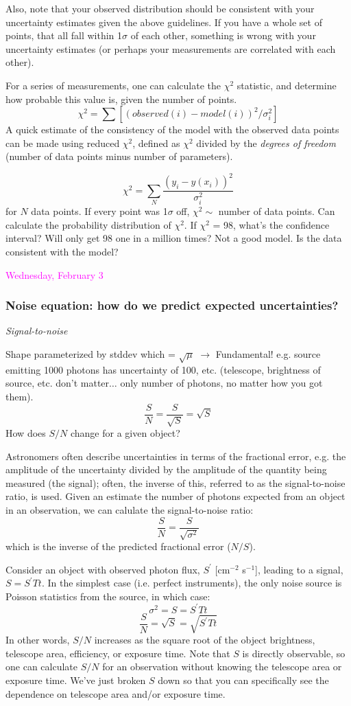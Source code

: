 \documentclass[12pt]{article}
\begin{document}
Also, note that your observed distribution should be
consistent with your uncertainty estimates given the above guidelines.
If you have a whole set of points, that all fall within 1$\sigma$ of
each other, something is wrong with your uncertainty estimates (or
perhaps your measurements are correlated with each other).

For a series of measurements, one can calculate the
$\chi^{2}$ statistic, and determine how probable this value is,
given the number of points.
    $$ \chi^2 = \sum [(observed(i)-model(i))^2/\sigma_i^2]  $$
A quick estimate of the consistency of the model with the observed
data points can be made using reduced $\chi^{2}$, defined as
$\chi^{2}$ divided by the \emph{degrees of freedom} (number of data points
minus number of parameters).

\textcolor{myBlue}{
    $$  \chi^2 = \sum_N \frac{(y_i-y(x_i))^2}{\sigma_i^2} $$
for $N$ data points. If every point was 1$\sigma$ off,
$\chi^2 \sim$ number of data points. Can calculate the probability
distribution of $\chi^2$. If $\chi^2$ = 98, what's the confidence
interval? Will only get 98 one in a million times? Not a good model.
Is the data consistent with the model?
}

\textcolor{magenta}{Wednesday, February 3}
\subsubsection*{Noise equation: how do we predict expected
uncertainties?}
\emph{Signal-to-noise}

\textcolor{myBlue}{
Shape parameterized by stddev which = $\sqrt{\mu}$
$\rightarrow$ Fundamental! e.g. source emitting 1000 photons has
uncertainty of 100, etc. (telescope, brightness of source, etc. don't
matter$\ldots$ only number of photons, no matter how you got them).
    $$ \frac{S}{N} = \frac{S}{\sqrt{S}} = \sqrt{S} $$
How does $S/N$ change for a given object?
}

Astronomers often describe uncertainties in terms of the fractional
error, e.g. the amplitude of the uncertainty divided by the amplitude
of the quantity being measured (the signal);
often, the inverse of this, referred
to as the signal-to-noise ratio, is used. Given an estimate the number
of photons expected from an object in an observation, we can calulate
the signal-to-noise ratio:
    $$ \frac{S}{N} = \frac{S}{\sqrt{\sigma^2}} $$
which is the inverse of the predicted fractional error ($N/S$).

Consider an object with observed photon flux, $S^{\prime}$
[cm$^{-2}$ s$^{-1}$],
leading to a signal, $S = S^{\prime}Tt$.
In the simplest case (i.e. perfect
instruments), the only noise
source is Poisson statistics from the source, in which case:
    $$ \sigma^2 = S = S^{\prime}Tt $$
    $$ \frac{S}{N} = \sqrt{S} = \sqrt{S^{\prime}Tt} $$
In other words, $S/N$ increases as the square root of the object
brightness, telescope area, efficiency, or exposure time. Note that $S$
is directly observable, so one can calculate $S/N$ for an
observation without knowing the telescope area or exposure time.
We've just broken $S$ down so that you can specifically see the dependence on
telescope area and/or exposure time.
\end{document}
